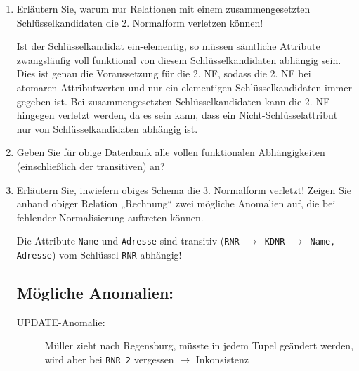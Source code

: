 \documentclass{lehramt-informatik-aufgabe}
\begin{document}
\begin{enumerate}


\item Erläutern Sie, warum nur Relationen mit einem zusammengesetzten
Schlüsselkandidaten die 2. Normalform verletzen können!

\begin{liAntwort}

Ist der Schlüsselkandidat ein-elementig, so müssen sämtliche Attribute
zwangsläufig voll funktional von diesem Schlüsselkandidaten abhängig
sein. Dies ist genau die Voraussetzung für die 2. NF, sodass die 2. NF
bei atomaren Attributwerten und nur ein-elementigen Schlüsselkandidaten
immer gegeben ist. Bei zusammengesetzten Schlüsselkandidaten kann die 2.
NF hingegen verletzt werden, da es sein kann, dass ein
Nicht-Schlüsselattribut nur von Schlüsselkandidaten abhängig ist.
\end{liAntwort}


\item Geben Sie für obige Datenbank alle vollen funktionalen
Abhängigkeiten (einschließlich der transitiven) an?

\begin{liAntwort}
\ttfamily
{}
\end{liAntwort}


\item Erläutern Sie, inwiefern obiges Schema die 3. Normalform verletzt!
Zeigen Sie anhand obiger Relation „Rechnung“ zwei mögliche Anomalien
auf, die bei fehlender Normalisierung auftreten können.

\begin{liAntwort}
Die Attribute \texttt{Name} und \texttt{Adresse} sind transitiv
(\texttt{RNR $\rightarrow$ KDNR $\rightarrow$ Name, Adresse})
vom Schlüssel \texttt{RNR} abhängig!

\subsection*{Mögliche Anomalien:}

\begin{description}
\item[UPDATE-Anomalie:] Müller zieht nach Regensburg, müsste in jedem
Tupel geändert werden, wird aber bei \texttt{RNR 2} vergessen $\rightarrow$
Inkonsistenz


\end{description}
\end{liAntwort}
\end{enumerate}
\end{document}
